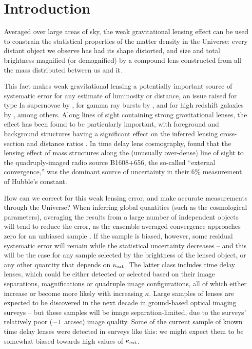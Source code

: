 \documentclass[useAMS,usenatbib]{mn2e}
\begin{document}
\setcounter{footnote}{1}


\section{Introduction}

Averaged over large areas of sky, the weak gravitational lensing effect can be
used to constrain the statistical properties of the matter density in the
Universe: every distant object we observe has had its shape distorted, and size
and total brightness magnified (or demagnified) by a compound lens constructed
from all the mass distributed between us and it.

This fact makes weak gravitational lensing a potentially important source of
systematic error for any estimate of luminosity or distance, an issue
raised for \eg 
type Ia supernovae by \citet[][]{Holz+Wald1998,Linder+Holz2004}, for
gamma ray bursts by \citet[][]{Oguri+Takahashi2006,Wang+Dai2011}, 
and for high redshift galaxies by \citet{BradacEtal2009}, among others. 
Along lines of sight containing strong gravitational lenses,
the effect has been found to be
particularly important, with foreground and background structures
having a significant effect on the inferred lensing cross-section
\citep[\eg][]{WongEtal2012} and distance ratios \citep[][]{DalalEtal2005}.
In time delay lens cosmography,
\citet{SuyuEtal2010} found that  the lensing effect of mass structures along the
(unusually over-dense)  line of sight to the quadruply-imaged radio source
B1608$+$656, the so-called ``external convergence,'' was the dominant source
of uncertainty in their 6\% measurement of Hubble's constant. 

How can we correct for this weak lensing error, and make
accurate measurements through the Universe? When inferring global quantities
(such as the cosmological parameters), averaging the results from a large
number of independent objects will tend to reduce the error, as the
ensemble-averaged convergence approaches zero for an unbiased sample
\citep[\eg][]{Linder+Holz2004}. If the sample is biased, however, some
residual systematic error will remain while the statistical uncertainty
decreases -- and this will be the case for any sample selected by the
brightness of the lensed object, or any other quantity that depends on
$\kappa_{\rm ext}$. The latter class includes time delay lenses, which could be
either detected or selected 
based on their image separations, magnifications or quadruple image
configurations, all of which either increase or become more likely with
increasing $\kappa$. Large
samples of lenses are expected to be discovered in the next decade in
ground-based optical imaging surveys \citep{Oguri+Marshall2010} -- but these
samples will be image separation-limited, due to the surveys' relatively poor
($\sim 1$~arcsec) image quality. Some of the current sample of known time
delay lenses were detected in surveys like this: we might expect them to be
somewhat biased towards high values of $\kappa_{\rm ext}$.
\end{document}
